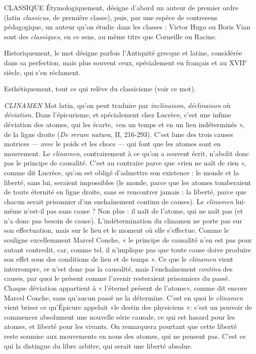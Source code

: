 CLASSIQUE Étymologiquement, désigne d’abord un auteur de premier ordre
(latin {\it classicus}, de première classe), puis, par une espèce de
contresens pédagogique, un auteur qu’on étudie dans les classes : Victor Hugo
ou Boris Vian sont des {\it classiques}, en ce sens, au même titre que Corneille ou
Racine.

Historiquement, le mot désigne parfois l’Antiquité grecque et latine, considérée
dans sa perfection, mais plus souvent ceux, spécialement en français et au
{\footnotesize XVII$^\text{e}$} siècle, qui s’en réclament.

Esthétiquement, tout ce qui relève du classicisme (voir ce mot).

{\it CLINAMEN} Mot latin, qu’on peut traduire par {\it inclinaison}, {\it déclinaison} où
{\it déviation}. Dans l’épicurisme, et spécialement chez Lucrèce,
c’est une infime déviation des atomes, qui les écarte, «en un temps et en un
lieu indéterminés », de la ligne droite ({\it De rerum natura}, II, 216-293). C’est
lune des trois causes motrices — avec le poids et les chocs — qui font que les
atomes sont en mouvement. Le {\it clinamen}, contrairement à ce qu’on a souvent
écrit, n’abolit donc pas le principe de causalité. C’est au contraire parce que
«rien ne naît de rien », comme dit Lucrèce, qu’on est obligé d'admettre son
existence : le monde et la liberté, sans lui, seraient impossibles (le monde, parce
que les atomes tomberaient de toute éternité en ligne droite, sans se rencontrer
jamais ; la liberté, parce que chacun serait prisonnier d’un enchaînement
continu de causes). Le {\it clinamen} lui-même n'est-il pas sans cause ? Non plus : il
naît de l'atome, qui ne naît pas (et n’a donc pas besoin de cause). L’indétermination
du clinamen ne porte pas sur son effectuation, mais sur le lieu et le
moment où elle s’effectue. Comme le souligne excellemment Marcel Conche,
« le principe de causalité n’en est pas pour autant contredit, car, comme tel, il
n'implique pas que toute cause doive produire son effet sous des conditions de
lieu et de temps ». Ce que le {\it clinamen} vient interrompre, ce n’est donc pas la
causalité, mais l’enchaînement {\it continu} des causes, par quoi le présent comme
l'avenir resteraient prisonniers du passé. Chaque déviation appartient à
« l'éternel présent de l'atome», comme dit encore Marcel Conche, sans
qu'aucun passé ne la détermine. C’est en quoi le {\it clinamen} vient briser ce
qu’Épicure appelait «le destin des physiciens »: c’est un pouvoir de commencer
absolument une nouvelle série causale, ce qui est hasard pour les
atomes, et liberté pour les vivants. On remarquera pourtant que cette liberté
reste soumise aux mouvements en nous des atomes, qui ne pensent pas. C’est
ce qui la distingue du libre arbitre, qui serait une liberté absolue.

